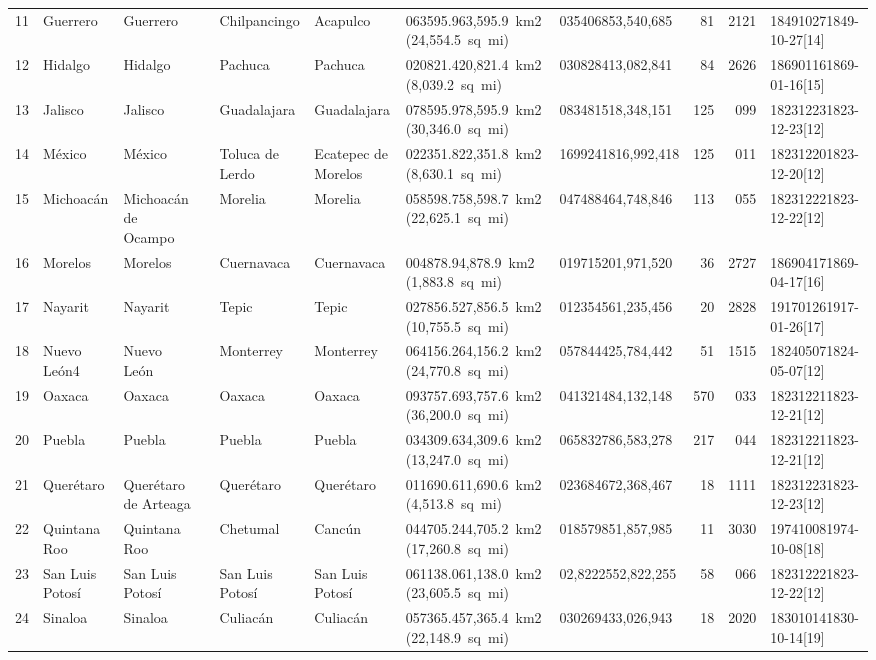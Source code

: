 \documentclass[11pt]{article}
\begin{document}
\begin{center}
\begin{tabular}{rlllllllrrl}
11 & Guerrero & Guerrero &  & Chilpancingo & Acapulco & 063595.963,595.9 km2 (24,554.5 sq mi) & 035406853,540,685 & 81 & 2121 & 184910271849-10-27[14]\\
12 & Hidalgo & Hidalgo &  & Pachuca & Pachuca & 020821.420,821.4 km2 (8,039.2 sq mi) & 030828413,082,841 & 84 & 2626 & 186901161869-01-16[15]\\
13 & Jalisco & Jalisco &  & Guadalajara & Guadalajara & 078595.978,595.9 km2 (30,346.0 sq mi) & 083481518,348,151 & 125 & 099 & 182312231823-12-23[12]\\
14 & México & México &  & Toluca de Lerdo & Ecatepec de Morelos & 022351.822,351.8 km2 (8,630.1 sq mi) & 1699241816,992,418 & 125 & 011 & 182312201823-12-20[12]\\
15 & Michoacán & Michoacán de Ocampo &  & Morelia & Morelia & 058598.758,598.7 km2 (22,625.1 sq mi) & 047488464,748,846 & 113 & 055 & 182312221823-12-22[12]\\
16 & Morelos & Morelos &  & Cuernavaca & Cuernavaca & 004878.94,878.9 km2 (1,883.8 sq mi) & 019715201,971,520 & 36 & 2727 & 186904171869-04-17[16]\\
17 & Nayarit & Nayarit &  & Tepic & Tepic & 027856.527,856.5 km2 (10,755.5 sq mi) & 012354561,235,456 & 20 & 2828 & 191701261917-01-26[17]\\
18 & Nuevo León4 & Nuevo León &  & Monterrey & Monterrey & 064156.264,156.2 km2 (24,770.8 sq mi) & 057844425,784,442 & 51 & 1515 & 182405071824-05-07[12]\\
19 & Oaxaca & Oaxaca &  & Oaxaca & Oaxaca & 093757.693,757.6 km2 (36,200.0 sq mi) & 041321484,132,148 & 570 & 033 & 182312211823-12-21[12]\\
20 & Puebla & Puebla &  & Puebla & Puebla & 034309.634,309.6 km2 (13,247.0 sq mi) & 065832786,583,278 & 217 & 044 & 182312211823-12-21[12]\\
21 & Querétaro & Querétaro de Arteaga &  & Querétaro & Querétaro & 011690.611,690.6 km2 (4,513.8 sq mi) & 023684672,368,467 & 18 & 1111 & 182312231823-12-23[12]\\
22 & Quintana Roo & Quintana Roo &  & Chetumal & Cancún & 044705.244,705.2 km2 (17,260.8 sq mi) & 018579851,857,985 & 11 & 3030 & 197410081974-10-08[18]\\
23 & San Luis Potosí & San Luis Potosí &  & San Luis Potosí & San Luis Potosí & 061138.061,138.0 km2 (23,605.5 sq mi) & 02,8222552,822,255 & 58 & 066 & 182312221823-12-22[12]\\
24 & Sinaloa & Sinaloa &  & Culiacán & Culiacán & 057365.457,365.4 km2 (22,148.9 sq mi) & 030269433,026,943 & 18 & 2020 & 183010141830-10-14[19]\\

\end{tabular}
\end{center}
\end{document}
